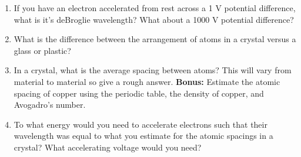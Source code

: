 \documentclass{tufte-handout}
\begin{document}
\begin{enumerate}
\item If you have an electron accelerated from rest across a 1 V potential difference, what is it's deBroglie wavelength? 
What about a 1000 V potential difference?

\item What is the difference between the arrangement of atoms in a crystal versus a glass or plastic?

\item In a crystal, what is the average spacing between atoms? This will vary from material to material 
so give a rough answer. {\bf Bonus:} Estimate the atomic spacing of copper using the periodic table, the density of copper, and Avogadro's number.

\item To what energy would you need to accelerate electrons such that their wavelength was equal to
what you estimate for the atomic spacings in a crystal?  What accelerating voltage would you need?

\end{enumerate}
\end{document}
